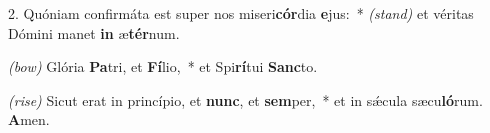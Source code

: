 2. Quóniam confirmáta est super nos miseri\textbf{cór}dia \textbf{e}jus:~* {\color{red}\textit{(stand)}} et véritas Dómini manet \textbf{in} æ\textbf{tér}num.

{\color{red}\textit{(bow)}} Glória \textbf{Pa}tri, et \textbf{Fí}lio,~* et Spi\textbf{rí}tui \textbf{Sanc}to.

{\color{red}\textit{(rise)}} Sicut erat in princípio, et \textbf{nunc}, et \textbf{sem}per,~* et in s\'{\ae}cula sæcu\textbf{ló}rum. \textbf{A}men.